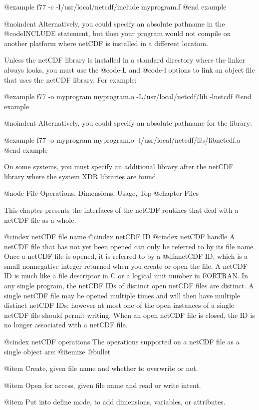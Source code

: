 @example
f77 -c -I/usr/local/netcdf/include myprogram.f
@end example

@noindent
Alternatively, you could specify an absolute pathname in the
@code{INCLUDE} statement, but then your program would not compile on
another platform where netCDF is installed in a different location.

Unless the netCDF library is installed in a standard directory where the
linker always looks, you must use the @code{-L} and @code{-l} options
to link an object file that uses the netCDF library.  For example:

@example
f77 -o myprogram myprogram.o -L/usr/local/netcdf/lib -lnetcdf
@end example

@noindent
Alternatively, you could specify an absolute pathname for the library:

@example
f77 -o myprogram myprogram.o -l/usr/local/netcdf/lib/libnetcdf.a
@end example

On some systems, you must specify an additional library after the netCDF
library where the system XDR libraries are found.


@node File Operations, Dimensions, Usage, Top
@chapter Files

This chapter presents the interfaces of the netCDF routines that deal
with a netCDF file as a whole.

@cindex netCDF file name
@cindex netCDF ID
@cindex netCDF handle
A netCDF file that has not yet been opened can only be referred to by
its file name.  Once a netCDF file is opened, it is referred to by a
@dfn{netCDF ID},
which is a small nonnegative integer returned when you create or
open the file.  A netCDF ID is much like a file
descriptor in C or a logical unit number in FORTRAN.  In any single
program, the netCDF IDs of distinct open netCDF files are distinct.  A single
netCDF file may be opened multiple times and will then have multiple
distinct netCDF IDs; however at most one of the open instances of a
single netCDF file should permit writing.  When an open netCDF file is
closed, the ID is no longer associated with a netCDF file.

@cindex netCDF operations
The operations supported on a netCDF file as a single object are:
@itemize @bullet

@item
Create, given file name and whether to overwrite or not.

@item
Open for access, given file name and read or write intent.

@item
Put into define mode, to add dimensions, variables, or attributes.

